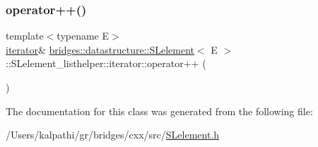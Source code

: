 \mbox{\label{classbridges_1_1datastructure_1_1_s_lelement_1_1_s_lelement__listhelper_1_1iterator_ab5847041e6e49fa6bcfd5efe6d2a1e1a}} 
\subsubsection{\texorpdfstring{operator++()}{operator++()}}
{\footnotesize\ttfamily template$<$typename E$>$ \\
\mbox{\hyperlink{classbridges_1_1datastructure_1_1_s_lelement_1_1_s_lelement__listhelper_1_1iterator}{iterator}}\& \mbox{\hyperlink{classbridges_1_1datastructure_1_1_s_lelement}{bridges\+::datastructure\+::\+S\+Lelement}}$<$ E $>$\+::S\+Lelement\+\_\+listhelper\+::iterator\+::operator++ (\begin{DoxyParamCaption}{ }\end{DoxyParamCaption})\hspace{0.3cm}{\ttfamily [inline]}}



The documentation for this class was generated from the following file\+:\begin{DoxyCompactItemize}
\item 
/\+Users/kalpathi/gr/bridges/cxx/src/\mbox{\hyperlink{_s_lelement_8h}{S\+Lelement.\+h}}\end{DoxyCompactItemize}
